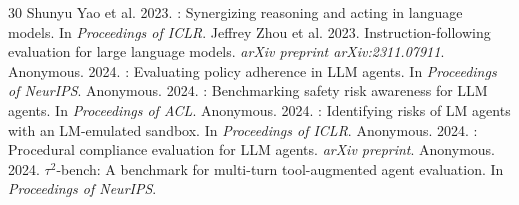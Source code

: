 \documentclass[11pt]{article}
\begin{document}
\begin{thebibliography}{30}
Shunyu Yao et al. 2023.
: Synergizing reasoning and acting in language models.
\newblock In \emph{Proceedings of ICLR}.
%
Jeffrey Zhou et al. 2023.
\newblock Instruction-following evaluation for large language models.
\newblock \emph{arXiv preprint arXiv:2311.07911}.
%
Anonymous. 2024.
: Evaluating policy adherence in LLM agents.
\newblock In \emph{Proceedings of NeurIPS}.
%
Anonymous. 2024.
: Benchmarking safety risk awareness for LLM agents.
\newblock In \emph{Proceedings of ACL}.
%
Anonymous. 2024.
: Identifying risks of LM agents with an LM-emulated sandbox.
\newblock In \emph{Proceedings of ICLR}.
%
Anonymous. 2024.
: Procedural compliance evaluation for LLM agents.
\newblock \emph{arXiv preprint}.
%
Anonymous. 2024.
\newblock $\tau^2$-bench: A benchmark for multi-turn tool-augmented agent evaluation.
\newblock In \emph{Proceedings of NeurIPS}.
\end{thebibliography}
\end{document}
